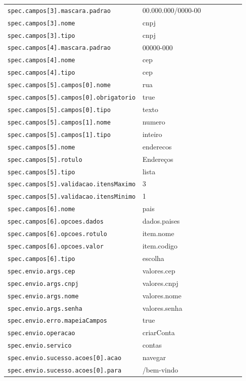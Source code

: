 \begin{tabular}{@{}p{0.35\linewidth}p{0.6\linewidth}@{}}
\texttt{spec.campos[3].mascara.padrao} & 00.000.000/0000-00 \\
\texttt{spec.campos[3].nome} & cnpj \\
\texttt{spec.campos[3].tipo} & cnpj \\
\texttt{spec.campos[4].mascara.padrao} & 00000-000 \\
\texttt{spec.campos[4].nome} & cep \\
\texttt{spec.campos[4].tipo} & cep \\
\texttt{spec.campos[5].campos[0].nome} & rua \\
\texttt{spec.campos[5].campos[0].obrigatorio} & true \\
\texttt{spec.campos[5].campos[0].tipo} & texto \\
\texttt{spec.campos[5].campos[1].nome} & numero \\
\texttt{spec.campos[5].campos[1].tipo} & inteiro \\
\texttt{spec.campos[5].nome} & enderecos \\
\texttt{spec.campos[5].rotulo} & Endereços \\
\texttt{spec.campos[5].tipo} & lista \\
\texttt{spec.campos[5].validacao.itensMaximo} & 3 \\
\texttt{spec.campos[5].validacao.itensMinimo} & 1 \\
\texttt{spec.campos[6].nome} & pais \\
\texttt{spec.campos[6].opcoes.dados} & dados.paises \\
\texttt{spec.campos[6].opcoes.rotulo} & item.nome \\
\texttt{spec.campos[6].opcoes.valor} & item.codigo \\
\texttt{spec.campos[6].tipo} & escolha \\
\texttt{spec.envio.args.cep} & valores.cep \\
\texttt{spec.envio.args.cnpj} & valores.cnpj \\
\texttt{spec.envio.args.nome} & valores.nome \\
\texttt{spec.envio.args.senha} & valores.senha \\
\texttt{spec.envio.erro.mapeiaCampos} & true \\
\texttt{spec.envio.operacao} & criarConta \\
\texttt{spec.envio.servico} & contas \\
\texttt{spec.envio.sucesso.acoes[0].acao} & navegar \\
\texttt{spec.envio.sucesso.acoes[0].para} & /bem-vindo \\

\end{tabular}
